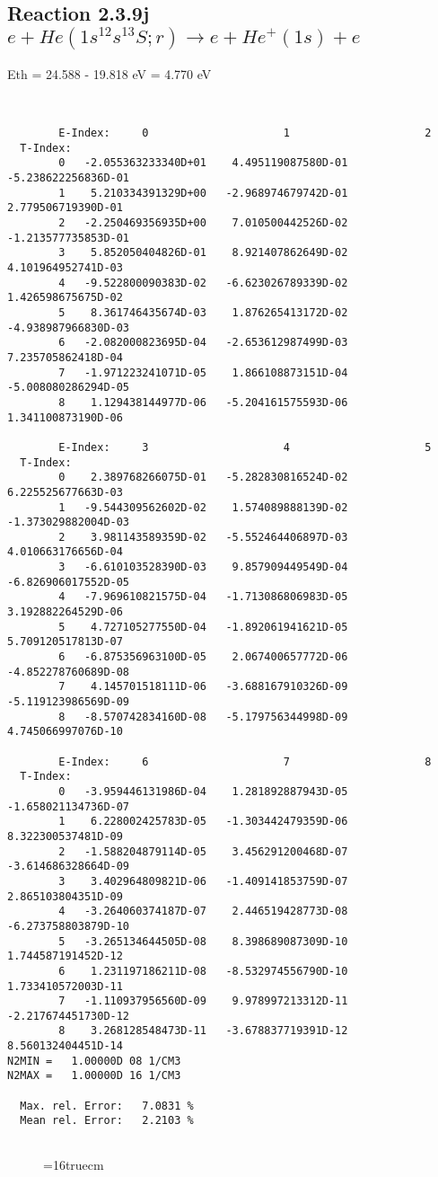 \documentclass[12pt,dvipdfmx]{article}
\begin{document}
\subsection{
Reaction 2.3.9j  $e + He(1s^12s^13S;r) \rightarrow e + He^+(1s) + e $
}
Eth = 24.588 - 19.818 eV = 4.770 eV


\begin{small}\begin{verbatim}


        E-Index:     0                     1                     2
  T-Index:
        0   -2.055363233340D+01    4.495119087580D-01   -5.238622256836D-01
        1    5.210334391329D+00   -2.968974679742D-01    2.779506719390D-01
        2   -2.250469356935D+00    7.010500442526D-02   -1.213577735853D-01
        3    5.852050404826D-01    8.921407862649D-02    4.101964952741D-03
        4   -9.522800090383D-02   -6.623026789339D-02    1.426598675675D-02
        5    8.361746435674D-03    1.876265413172D-02   -4.938987966830D-03
        6   -2.082000823695D-04   -2.653612987499D-03    7.235705862418D-04
        7   -1.971223241071D-05    1.866108873151D-04   -5.008080286294D-05
        8    1.129438144977D-06   -5.204161575593D-06    1.341100873190D-06

        E-Index:     3                     4                     5
  T-Index:
        0    2.389768266075D-01   -5.282830816524D-02    6.225525677663D-03
        1   -9.544309562602D-02    1.574089888139D-02   -1.373029882004D-03
        2    3.981143589359D-02   -5.552464406897D-03    4.010663176656D-04
        3   -6.610103528390D-03    9.857909449549D-04   -6.826906017552D-05
        4   -7.969610821575D-04   -1.713086806983D-05    3.192882264529D-06
        5    4.727105277550D-04   -1.892061941621D-05    5.709120517813D-07
        6   -6.875356963100D-05    2.067400657772D-06   -4.852278760689D-08
        7    4.145701518111D-06   -3.688167910326D-09   -5.119123986569D-09
        8   -8.570742834160D-08   -5.179756344998D-09    4.745066997076D-10

        E-Index:     6                     7                     8
  T-Index:
        0   -3.959446131986D-04    1.281892887943D-05   -1.658021134736D-07
        1    6.228002425783D-05   -1.303442479359D-06    8.322300537481D-09
        2   -1.588204879114D-05    3.456291200468D-07   -3.614686328664D-09
        3    3.402964809821D-06   -1.409141853759D-07    2.865103804351D-09
        4   -3.264060374187D-07    2.446519428773D-08   -6.273758803879D-10
        5   -3.265134644505D-08    8.398689087309D-10    1.744587191452D-12
        6    1.231197186211D-08   -8.532974556790D-10    1.733410572003D-11
        7   -1.110937956560D-09    9.978997213312D-11   -2.217674451730D-12
        8    3.268128548473D-11   -3.678837719391D-12    8.560132404451D-14
N2MIN =   1.00000D 08 1/CM3
N2MAX =   1.00000D 16 1/CM3

  Max. rel. Error:   7.0831 %
  Mean rel. Error:   2.2103 %


\end{verbatim}\end{small}
\begin{figure} \label{2.3.9j}
\epsfxsize=16truecm
\end{figure}
\newpage
\end{document}

